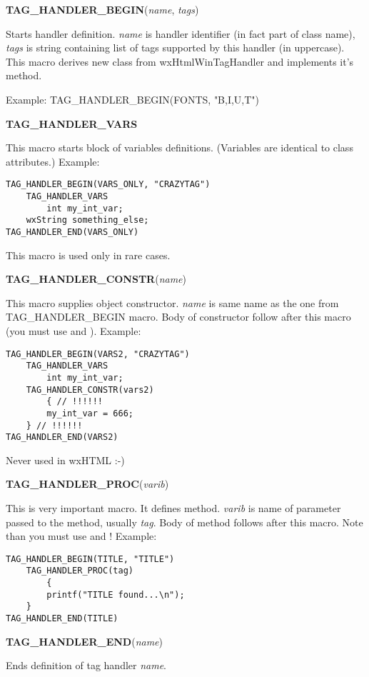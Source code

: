 {\bf TAG\_HANDLER\_BEGIN}({\it name}, {\it tags})

Starts handler definition. {\it name} is handler identifier (in fact
part of class name), {\it tags} is string containing list of tags
supported by this handler (in uppercase). This macro derives new class from
wxHtmlWinTagHandler and implements it's 
 method.

Example: TAG\_HANDLER\_BEGIN(FONTS, "B,I,U,T")

{\bf TAG\_HANDLER\_VARS}

This macro starts block of variables definitions. (Variables are identical
to class attributes.) Example:

\begin{verbatim}
TAG_HANDLER_BEGIN(VARS_ONLY, "CRAZYTAG")
    TAG_HANDLER_VARS
        int my_int_var;
	wxString something_else;
TAG_HANDLER_END(VARS_ONLY)
\end{verbatim}

This macro is used only in rare cases.

{\bf TAG\_HANDLER\_CONSTR}({\it name})

This macro supplies object constructor. {\it name} is same name as the one
from TAG\_HANDLER\_BEGIN macro. Body of constructor follow after
this macro (you must use { and } ). Example:

\begin{verbatim}
TAG_HANDLER_BEGIN(VARS2, "CRAZYTAG")
    TAG_HANDLER_VARS
        int my_int_var;
    TAG_HANDLER_CONSTR(vars2)
        { // !!!!!!
	    my_int_var = 666;
	} // !!!!!!
TAG_HANDLER_END(VARS2)
\end{verbatim}

Never used in wxHTML :-)

{\bf TAG\_HANDLER\_PROC}({\it varib})

This is very important macro. It defines 
method. {\it varib} is name of parameter passed to the method, usually
{\it tag}. Body of method follows after this macro.
Note than you must use { and } ! Example:

\begin{verbatim}
TAG_HANDLER_BEGIN(TITLE, "TITLE")
    TAG_HANDLER_PROC(tag)
        {
	    printf("TITLE found...\n");
	}
TAG_HANDLER_END(TITLE)
\end{verbatim}

{\bf TAG\_HANDLER\_END}({\it name})

Ends definition of tag handler {\it name}. 


